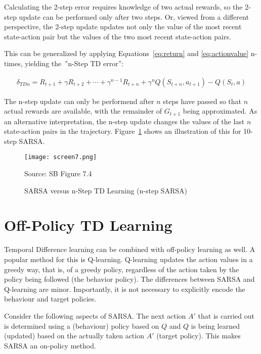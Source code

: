 Calculating the 2-step error requires knowledge of two actual rewards, so the 2-step update can be performed only after two steps. Or, viewed from a different perspective, the 2-step update updates not only the value of the most recent state-action pair but the values of the two most recent state-action pairs. 

This can be generalized by applying Equations~\ref{eq:return} and \ref{eq:actionvalue} n-times, yielding the \emph''{n-Step TD error}'':

\begin{align*}
\delta_{TDn} = R_{t+1} + \gamma R_{t+2} + \cdots + \gamma^{n-1} R_{t+n} + \gamma^n Q(S_{t+n}, a_{t+1}) - Q(S_t, a)
\end{align*}

The n-step update can only be performend after $n$ steps have passed so that $n$ actual rewards are available, with the remainder of $G_{t+1}$ being approximated. As an alternative interpretation, the n-step update changes the values of the last $n$ state-action pairs in the trajectory. Figure~\ref{fig:sarsa10step} shows an illustration of this for 10-step SARSA.


\begin{figure}
\centering
\texttt{[image: screen7.png]}

\scriptsize
Source: SB Figure 7.4
\caption{SARSA versus n-Step TD Learning (n-step SARSA)}
\label{fig:sarsa10step}
\end{figure}


\section{Off-Policy TD Learning}

Temporal Difference learning can be combined with off-policy learning as well. A popular method for this is Q-learning. Q-learning updates the action values in a greedy way, that is, of a greedy policy, regardless of the action taken by the policy being followed (the behavior policy). The differences between SARSA and Q-learning are minor. Importantly, it is not necessary to explicitly encode the behaviour and target policies.

Consider the following aspects of SARSA. The next action $A'$ that is carried out is determined using a (behaviour) policy based on $Q$ and $Q$ is being learned (updated) based on the actually taken action $A'$ (target policy). This makes SARSA an on-policy method.

